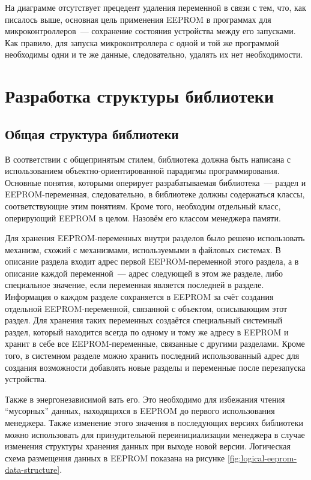 На диаграмме отсутствует прецедент удаления переменной в связи с тем, что, как писалось выше, основная цель применения EEPROM в программах для  микроконтроллеров~--- сохранение состояния устройства между его запусками.
Как правило, для запуска микроконтроллера с одной и той же программой необходимы одни и те же данные, следовательно, удалять их нет необходимости.

\section{Разработка структуры библиотеки}

\subsection{Общая структура библиотеки} \label{subsection:library-structure}

В соответствии с общепринятым стилем, библиотека должна быть написана с использованием объектно-ориентированной парадигмы программирования.
Основные понятия, которыми оперирует разрабатываемая библиотека~--- раздел и EEPROM-переменная, следовательно, в библиотеке должны содержаться классы, соответствующие этим понятиям.
Кроме того, необходим отдельный класс, оперирующий EEPROM в целом. Назовём его классом менеджера памяти.

Для хранения EEPROM-переменных внутри разделов было решено использовать механизм, схожий с механизмами, используемыми в файловых системах.
В описание раздела входит адрес первой EEPROM-переменной этого раздела, а в описание каждой переменной~--- адрес следующей в этом же разделе, либо специальное значение, если переменная является последней в разделе.
Информация о каждом разделе сохраняется в EEPROM за счёт создания отдельной EEPROM-переменной, связанной с объектом, описывающим этот раздел.
Для хранения таких переменных создаётся специальный системный раздел, который находится всегда по одному и тому же адресу в EEPROM и хранит в себе все EEPROM-переменные, связанные с другими разделами.
Кроме того, в системном разделе можно хранить последний использованный адрес для создания возможности добавлять новые разделы и переменные после перезапуска устройства.

Также в энергонезависимой  вать его.
Это необходимо для избежания чтения "`мусорных"' данных, находящихся в EEPROM до первого использования менеджера.
Также изменение этого значения в последующих версиях библиотеки можно использовать для принудительной переинициализации менеджера в случае изменения структуры хранения данных при выходе новой версии.
Логическая схема размещения данных в EEPROM показана на рисунке \ref{fig:logical-eeprom-data-structure}.


